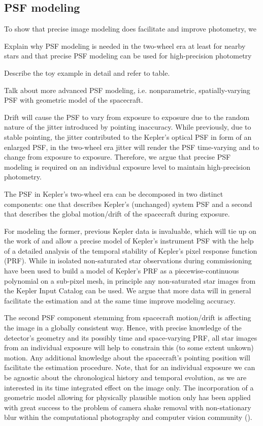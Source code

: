 \documentclass[letterpaper,12pt,whitepaper]{haastex}
\begin{document}
\subsection{PSF modeling}\label{sec:psf}

To show that precise image modeling does facilitate and improve
photometry, we 


Explain why PSF modeling is needed in the two-wheel era at least for
nearby stars and that precise PSF modeling can be used for
high-precision photometry

Describe the toy example in detail and refer to table. 

Talk about more advanced PSF modeling, i.e. nonparametric,
spatially-varying PSF with geometric model of the spacecraft.


Drift will cause the PSF to vary from exposure to exposure due to the
random nature of the jitter introduced by pointing inaccuracy. While
previously, due to stable pointing, the jitter contributed to the
Kepler's optical PSF in form of an enlarged PSF, in the two-wheel era
jitter will render the PSF time-varying and to change from exposure to
exposure. Therefore, we argue that precise PSF modeling is required on
an individual exposure level to maintain high-precision photometry.

The PSF in Kepler's two-wheel era can be decomposed in two distinct
components: one that describes Kepler's (unchanged) system PSF and a
second that describes the global motion/drift of the spacecraft during
exposure.

For modeling the former, previous Kepler data is invaluable, which
will tie up on the work of \cite{bryson2010} and allow a precise model
of Kepler's instrument PSF with the help of a detailed analysis of the
temporal stability of Kepler's pixel response function (PRF). While in
\cite{bryson2010} isolated non-saturated star observations during
commissioning have been used to build a model of Kepler's PRF as a
piecewise-continuous polynomial on a sub-pixel mesh, in principle any
non-saturated star images from the Kepler Input Catalog can be
used. We argue that more data will in general facilitate the
estimation and at the same time improve modeling accuracy.

The second PSF component stemming from spacecraft motion/drift is
affecting the image in a globally consistent way. Hence, with precise
knowledge of the detector's geometry and its possibly time and
space-varying PRF, all star images from an individual exposure will
help to constrain this (to some extent unkown) motion. Any additional
knowledge about the spacecraft's pointing position will facilitate the
estimation procedure. Note, that for an individual exposure we can be
agnostic about the chronological history and temporal evolution, as we
are interested in its time integrated effect on the image only. The
incorporation of a geometric model allowing for physically plausible
motion only has been applied with great success to the problem of
camera shake removal with non-stationary blur within the computational
photography and computer vision community
(\cite{fergus2006,whyte2010,hirsch2011,koehler2012}).
\end{document}
